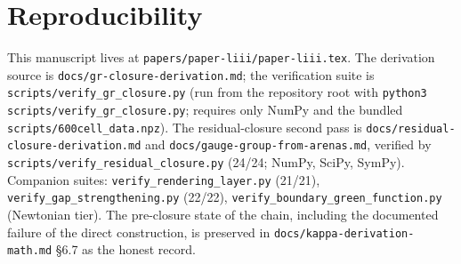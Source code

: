 \documentclass[12pt]{article}
\theoremstyle{definition}
\theoremstyle{remark}
\begin{document}
\section{Reproducibility}\label{sec:repro}

This manuscript lives at \texttt{papers/paper-liii/paper-liii.tex}. The derivation source is \texttt{docs/gr-closure-derivation.md}; the verification suite is \texttt{scripts/verify\_gr\_closure.py} (run from the repository root with \texttt{python3 scripts/verify\_gr\_closure.py}; requires only NumPy and the bundled \texttt{scripts/600cell\_data.npz}). The residual-closure second pass is \texttt{docs/residual-closure-derivation.md} and \texttt{docs/gauge-group-from-arenas.md}, verified by \texttt{scripts/verify\_residual\_closure.py} (24/24; NumPy, SciPy, SymPy). Companion suites: \texttt{verify\_rendering\_layer.py} (21/21), \texttt{verify\_gap\_strengthening.py} (22/22), \texttt{verify\_boundary\_green\_function.py} (Newtonian tier). The pre-closure state of the chain, including the documented failure of the direct construction, is preserved in \texttt{docs/kappa-derivation-math.md} \S6.7 as the honest record.



\end{document}
